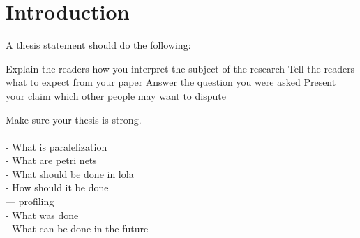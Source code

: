 \chapter{Introduction}

A thesis statement should do the following:

Explain the readers how you interpret the subject of the research
Tell the readers what to expect from your paper
Answer the question you were asked
Present your claim which other people may want to dispute

Make sure your thesis is strong.\\\\

- What is paralelization\\
- What are petri nets\\
- What should be done in lola\\
- How should it be done\\
--- profiling\\
- What was done\\
- What can be done in the future\\